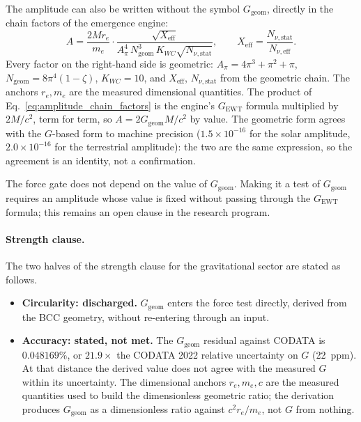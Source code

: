 \documentclass[10pt,a4paper]{article}
\begin{document}
The amplitude can also be written without the symbol $G_{\text{geom}}$,
directly in the chain factors of the emergence engine:
\begin{equation}
	A
	=
	\frac{2 M r_e}{m_e}
	\cdot
	\frac{\sqrt{X_{\text{eff}}}}
	{A_\pi^4 \, N_{\text{geom}}^3 \, K_{WC} \sqrt{N_{\nu,\text{stat}}}},
	\qquad
	X_{\text{eff}} = \frac{N_{\nu,\text{stat}}}{N_{\nu,\text{eff}}}.
	\label{eq:amplitude_chain_factors}
\end{equation}
Every factor on the right-hand side is geometric:
$A_\pi = 4\pi^3 + \pi^2 + \pi$, $N_{\text{geom}} = 8\pi^4(1-\zeta)$,
$K_{WC} = 10$, and $X_{\text{eff}}$, $N_{\nu,\text{stat}}$ from the
geometric chain. The anchors $r_e, m_e$ are the measured dimensional
quantities. The product of Eq.~\eqref{eq:amplitude_chain_factors} is
the engine's $G_{\text{EWT}}$ formula multiplied by $2M/c^2$, term for
term, so $A = 2G_{\text{geom}}M/c^2$ by value. The geometric form
agrees with the $G$-based form to machine precision
($1.5 \times 10^{-16}$ for the solar amplitude, $2.0 \times 10^{-16}$
for the terrestrial amplitude): the two are the same expression, so
the agreement is an identity, not a confirmation.

The force gate does not depend on the value of $G_{\text{geom}}$.
Making it a test of $G_{\text{geom}}$ requires an amplitude whose value
is fixed without passing through the $G_{\text{EWT}}$ formula; this
remains an open clause in the research program.

\paragraph{Strength clause.} The two halves of the strength clause
for the gravitational sector are stated as follows.

\begin{itemize}
	\item \textbf{Circularity: discharged.} $G_{\text{geom}}$ enters
	the force test directly, derived from the BCC geometry,
	without re-entering through an input.
	\item \textbf{Accuracy: stated, not met.} The $G_{\text{geom}}$
	residual against CODATA is $0.048169\%$, or $21.9\times$
	the CODATA 2022 relative uncertainty on $G$ (22~ppm). At
	that distance the derived value does not agree with the
	measured $G$ within its uncertainty. The dimensional
	anchors $r_e, m_e, c$ are the measured quantities used to
	build the dimensionless geometric ratio; the derivation
	produces $G_{\text{geom}}$ as a dimensionless ratio against
	$c^2 r_e / m_e$, not $G$ from nothing.
\end{itemize}
\end{document}
